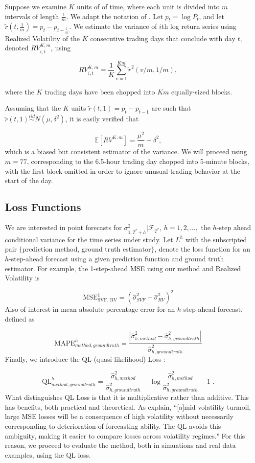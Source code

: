 \documentclass[11pt]{article}
\newcommand{\simiid}{\stackrel{iid}{\sim}} %
\def\E{\mathbb{E}} %
\theoremstyle{definition}
\begin{document}
    Suppose we examine $K$ units of of time, where each unit is divided into $m$ intervals of length $\frac{1}{m}$.  We adapt the notation of \citet{andersen2009realized}. Let $p_{t} = \log{P_{t}}$, and let $\tilde{r}(t,\frac{1}{m}) = p_{t} - p_{t-\frac{1}{m}}$.  We estimate the variance of $i$th log return series using Realized Volatility of the $K$ consecutive trading days that conclude with day $t$, denoted $RV_{i,t}^{K,m}$, using
    
    $$RV_{i,t}^{K,m} = \frac{1}{K}\sum^{Km}_{v=1}\tilde{r}^{2}(v/m,1/m),$$

    where the $K$ trading days have been chopped into $Km$ equally-sized blocks.

    Assuming that the $K$ units $\tilde{r}(t, 1) = p_{t} - p_{t-1}$ are such that $\tilde{r}(t, 1) \simiid N(\mu, \delta^{2})$, it is easily verified that 
    
    $$\E[RV^{K,m}] = \frac{\mu^{2}}{m} + \delta^{2},$$
    which is a biased but consistent estimator of the variance.  We will proceed using $m = 77$, corresponding to the 6.5-hour trading day chopped into 5-minute blocks, with the first block omitted in order to ignore unusual trading behavior at the start of the day.

\subsection{Loss Functions}

We are interested in point forecasts for $\sigma^{2}_{1,T^{*}+h}|\mathcal{F}_{T^{*}}$, $h=1,2,...,$ the $h$-step ahead conditional variance for the time series under study.  Let $L^{h}$ with the subscripted pair $\{$prediction method, ground truth estimator$\}$, denote the loss function for an $h$-step-ahead forecast using a given prediction function and ground truth estimator.  For example, the 1-step-ahead MSE using our method and Realized Volatility is

$$ \text{MSE}^{1}_{\text{SVF, RV}} = (\hat\sigma^{2}_{SVF} - \hat\sigma^{2}_{RV})^{2}$$
Also of interest in mean absolute percentage error for an $h$-step-ahead forecast, defined as

\[ 
\text{MAPE}^{h}_{method, ground truth} = \frac{|\hat\sigma^{2}_{h, method} - \hat\sigma^{2}_{h, ground truth}|}{\hat\sigma^{2}_{h, ground truth}}
\]
Finally, we introduce the QL (quasi-likelihood) Loss \citep{brownlees2011practical}:

\[ 
\text{QL}^{h}_{method, ground truth} = \frac{ \hat\sigma^{2}_{h, method} }{\hat\sigma^{2}_{h, ground truth}} - \log{\frac{ \hat\sigma^{2}_{h, method} }{\hat\sigma^{2}_{h, ground truth}}} -1 \text{ .}
\]
What distinguishes QL Loss is that it is multiplicative rather than additive.  This has benefits, both practical and theoretical.  As \citet{brownlees2011practical} explain, ``[a]mid volatility turmoil, large MSE
losses will be a consequence of high volatility without necessarily corresponding to
deterioration of forecasting ability. The QL avoids this ambiguity, making it easier to
compare losses across volatility regimes."  For this reason, we proceed to evaluate the method, both in simuations and real data examples, using the QL loss.
\end{document}
